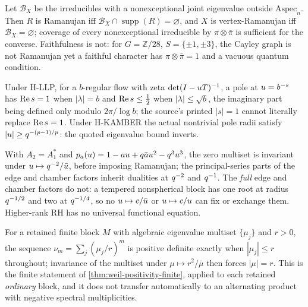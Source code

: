 \begin{proposition}
\label{prop:coverage-converse}
Let $\mathcal B_X$ be the irreducibles with a nonexceptional joint eigenvalue
outside $\mathrm{Aspec}_n$. Then $R$ is Ramanujan iff
$\mathcal B_X\cap\operatorname{supp}(R) = \varnothing$, and $X$ is
vertex-Ramanujan iff $\mathcal B_X = \varnothing$; coverage of every
nonexceptional irreducible by $\pi\otimes\bar\pi$ is sufficient for the
converse. Faithfulness is not: for $G = \mathbb Z/28$, $S = \{\pm1,\pm3\}$, the
Cayley graph is not Ramanujan yet a faithful character has
$\pi\otimes\bar\pi = 1$ and a vacuous quantum condition.
\end{proposition}

\begin{proposition}
\label{prop:one-sided-rh-variable}
Under H-LLP, for a $b$-regular flow with zeta $\det(I-u T)^{-1}$, a pole at
$u = b^{-s}$ has $\operatorname{Re} s = 1$ when $|\lambda| = b$ and $\operatorname{Re} s\le\frac12$ when
$|\lambda|\le\sqrt b$, the imaginary part being defined only modulo
$2\pi/\log b$; the source's printed $|s| = 1$ cannot literally replace
$\operatorname{Re} s = 1$. Under H-KAMBER the actual nontrivial pole radii satisfy
$|u|\ge q^{-(p-1)/p}$: the quoted eigenvalue bound inverts.
\end{proposition}

\begin{proposition}
\label{prop:rank-three-dualities}
With $A_2 = A_1^*$ and $p_a(u) = 1-au+q\bar au^2-q^3u^3$, the zero
multiset is invariant under $u\mapsto q^{-2}/\bar{u}$, before imposing
Ramanujan; the principal-series parts of the edge and chamber factors inherit
dualities at $q^{-2}$ and $q^{-1}$. The \emph{full} edge and chamber factors
do not: a tempered nonspherical block has one root at radius $q^{-1/2}$ and
two at $q^{-1/4}$, so no $u\mapsto c/\bar{u}$ or $u\mapsto c/u$ can fix
or exchange them. Higher-rank RH has no universal functional equation.
\end{proposition}

\begin{proposition}
\label{prop:weil-positivity-blocks}
For a retained finite block $M$ with algebraic eigenvalue multiset $\{\mu_j\}$ %
and $r>0$, the sequence $\nu_m = \sum_j(\mu_j/r)^m$ is positive definite exactly %
when $|\mu_j|\le r$ throughout; invariance of the multiset under %
$\mu\mapsto r^2/\bar\mu$ then forces $|\mu| = r$. This is the finite statement %
of \cref{thm:weil-positivity-finite}, applied to each retained \emph{ordinary}
block, and it does not transfer automatically to an alternating product with
negative spectral multiplicities.
\end{proposition}

